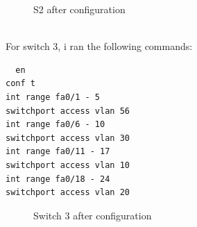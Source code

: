 \documentclass[../EngineeringJournal_CDavis.tex]{subfiles}
\begin{document}
\begin{figure}[!hbt]\centering
{}\hfill
{}\par 
\caption{S2 after configuration}
\label{Show12S2}
\end{figure}

\noindent{}\\
For switch 3, i ran the following commands:

\begin{verbatim}
  en
conf t
int range fa0/1 - 5
switchport access vlan 56
int range fa0/6 - 10
switchport access vlan 30
int range fa0/11 - 17
switchport access vlan 10
int range fa0/18 - 24
switchport access vlan 20
\end{verbatim}


\begin{figure}[!hbt]\centering
{}\hfill
{}\par 
\caption{Switch 3 after configuration}
\label{Show12S3}
\end{figure}
\end{document}
